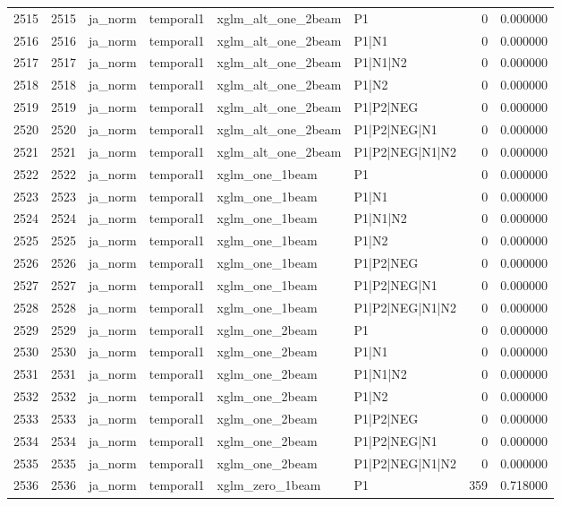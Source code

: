 \begin{tabular}{lrllllrr}
2515 & 2515 & ja_norm & temporal1 & xglm_alt_one_2beam & P1 & 0 & 0.000000 \\
2516 & 2516 & ja_norm & temporal1 & xglm_alt_one_2beam & P1|N1 & 0 & 0.000000 \\
2517 & 2517 & ja_norm & temporal1 & xglm_alt_one_2beam & P1|N1|N2 & 0 & 0.000000 \\
2518 & 2518 & ja_norm & temporal1 & xglm_alt_one_2beam & P1|N2 & 0 & 0.000000 \\
2519 & 2519 & ja_norm & temporal1 & xglm_alt_one_2beam & P1|P2|NEG & 0 & 0.000000 \\
2520 & 2520 & ja_norm & temporal1 & xglm_alt_one_2beam & P1|P2|NEG|N1 & 0 & 0.000000 \\
2521 & 2521 & ja_norm & temporal1 & xglm_alt_one_2beam & P1|P2|NEG|N1|N2 & 0 & 0.000000 \\
2522 & 2522 & ja_norm & temporal1 & xglm_one_1beam & P1 & 0 & 0.000000 \\
2523 & 2523 & ja_norm & temporal1 & xglm_one_1beam & P1|N1 & 0 & 0.000000 \\
2524 & 2524 & ja_norm & temporal1 & xglm_one_1beam & P1|N1|N2 & 0 & 0.000000 \\
2525 & 2525 & ja_norm & temporal1 & xglm_one_1beam & P1|N2 & 0 & 0.000000 \\
2526 & 2526 & ja_norm & temporal1 & xglm_one_1beam & P1|P2|NEG & 0 & 0.000000 \\
2527 & 2527 & ja_norm & temporal1 & xglm_one_1beam & P1|P2|NEG|N1 & 0 & 0.000000 \\
2528 & 2528 & ja_norm & temporal1 & xglm_one_1beam & P1|P2|NEG|N1|N2 & 0 & 0.000000 \\
2529 & 2529 & ja_norm & temporal1 & xglm_one_2beam & P1 & 0 & 0.000000 \\
2530 & 2530 & ja_norm & temporal1 & xglm_one_2beam & P1|N1 & 0 & 0.000000 \\
2531 & 2531 & ja_norm & temporal1 & xglm_one_2beam & P1|N1|N2 & 0 & 0.000000 \\
2532 & 2532 & ja_norm & temporal1 & xglm_one_2beam & P1|N2 & 0 & 0.000000 \\
2533 & 2533 & ja_norm & temporal1 & xglm_one_2beam & P1|P2|NEG & 0 & 0.000000 \\
2534 & 2534 & ja_norm & temporal1 & xglm_one_2beam & P1|P2|NEG|N1 & 0 & 0.000000 \\
2535 & 2535 & ja_norm & temporal1 & xglm_one_2beam & P1|P2|NEG|N1|N2 & 0 & 0.000000 \\
2536 & 2536 & ja_norm & temporal1 & xglm_zero_1beam & P1 & 359 & 0.718000 \\

\end{tabular}
